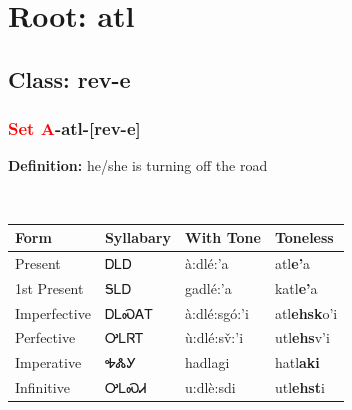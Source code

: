 \needspace{4in}
\section*{Root: atl}
\nopagebreak
{}
\needspace{3in}
\subsection*{Class: rev-e}
\nopagebreak
\needspace{2in}
\subsubsection*{\textcolor{Red}{Set A}{-}\textbf{atl}{-}[rev-e]}
\nopagebreak
\textbf{Definition: } he/she is turning off the road
\\[0.5em]
\begin{tabularx}{\textwidth}{l X X X}%
\toprule%
\textbf{Form}&\textbf{Syllabary}&\textbf{With Tone}&\textbf{Toneless}\\%
\midrule%
Present&ᎠᏞᎠ&à:dlé:’a&atl\textbf{e'}a\\%
1st Present&ᎦᏞᎠ&gadlé:’a&katl\textbf{e'}a\\%
Imperfective&ᎠᏞᏍᎪᎢ&à:dlé:sgó:’i&atl\textbf{ehsk}o'i\\%
Perfective&ᎤᏞᏒᎢ&ù:dlé:sv̌:’i&utl\textbf{ehs}v'i\\%
Imperative&ᎭᏜᎩ&hadlagi&hatl\textbf{aki}\\%
Infinitive&ᎤᏞᏍᏗ&u:dlè:sdi&utl\textbf{ehst}i\\%
\bottomrule%
\end{tabularx}
\\[1em]